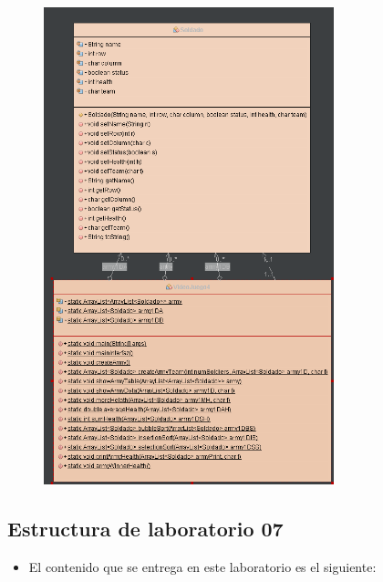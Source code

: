 \documentclass{article}
\begin{document}
        \begin{figure}[H]
            \centering
            \includegraphics[width=0.75\textwidth,keepaspectratio]{img/diagrama07.png}
            \caption{}
        \end{figure}

    \newpage
	\subsection{Estructura de laboratorio 07}
    \begin{itemize}	
		\item El contenido que se entrega en este laboratorio es el siguiente:
	\end{itemize}
	
\end{document}
